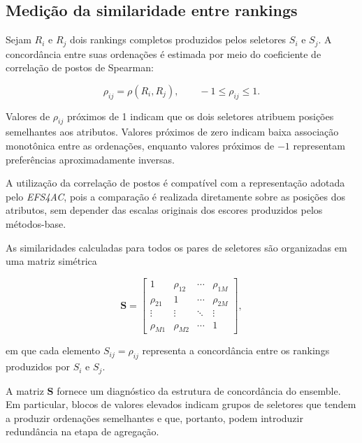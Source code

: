 \subsection{Medição da similaridade entre rankings}
\label{subsec:ac-efs-similaridade}

Sejam $R_i$ e $R_j$ dois rankings completos produzidos pelos seletores
$S_i$ e $S_j$. A concordância entre suas ordenações é estimada por meio do
coeficiente de correlação de postos de Spearman:

\begin{equation}
    \rho_{ij}
    =
    \rho(R_i,R_j),
    \qquad
    -1\leq\rho_{ij}\leq1.
    \label{eq:spearman-ac-efs}
\end{equation}

Valores de $\rho_{ij}$ próximos de 1 indicam que os dois seletores atribuem
posições semelhantes aos atributos. Valores próximos de zero indicam baixa
associação monotônica entre as ordenações, enquanto valores próximos de $-1$
representam preferências aproximadamente inversas.

A utilização da correlação de postos é compatível com a representação adotada
pelo \textit{EFS4AC}, pois a comparação é realizada diretamente sobre as
posições dos atributos, sem depender das escalas originais dos escores
produzidos pelos métodos-base.

As similaridades calculadas para todos os pares de seletores são organizadas
em uma matriz simétrica

\begin{equation}
    \mathbf{S}
    =
    \begin{bmatrix}
        1          & \rho_{12} & \cdots & \rho_{1M} \\
        \rho_{21}  & 1         & \cdots & \rho_{2M} \\
        \vdots     & \vdots    & \ddots & \vdots    \\
        \rho_{M1}  & \rho_{M2} & \cdots & 1
    \end{bmatrix},
    \label{eq:matriz-similaridade-ac-efs}
\end{equation}

em que cada elemento $S_{ij}=\rho_{ij}$ representa a concordância entre os
rankings produzidos por $S_i$ e $S_j$.

A matriz $\mathbf{S}$ fornece um diagnóstico da estrutura de concordância do
ensemble. Em particular, blocos de valores elevados indicam grupos de
seletores que tendem a produzir ordenações semelhantes e que, portanto, podem
introduzir redundância na etapa de agregação.


